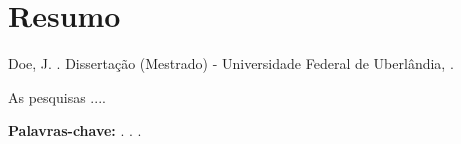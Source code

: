

\chapter*{Resumo}


\noindent
Doe, J. \emph{\@titulo}. Dissertação (Mestrado) - Universidade Federal de Uberlândia, \mes { } \@year.
\newline

As pesquisas ....


\textbf{Palavras-chave:} \@pchaveA. \@pchaveB. \@pchaveC.
